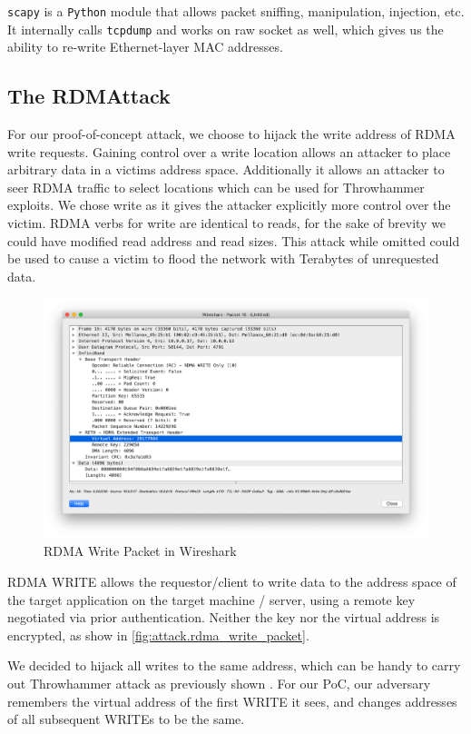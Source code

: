 \texttt{scapy} is a \texttt{Python} module that allows packet sniffing,
manipulation, injection, etc.  It internally calls \texttt{tcpdump} and works on
raw socket as well, which gives us the ability to re-write Ethernet-layer MAC
addresses.

\subsection{The RDMAttack }
\label{sec:attack.model}

For our proof-of-concept attack, we choose to hijack the write address of RDMA
write requests. Gaining control over a write location allows an attacker to
place arbitrary data in a victims address space. Additionally it allows an
attacker to seer RDMA traffic to select locations which can be used for
Throwhammer exploits. We chose write as it gives the attacker explicitly more
control over the victim. RDMA verbs for write are identical to reads, for the
sake of brevity we could have modified read address and read sizes. This attack
while omitted could be used to cause a victim to flood the network with
Terabytes of unrequested data.

\begin{figure}[h]
    \centering
    \includegraphics[width=0.5\textwidth - 5pt]{fig/rdma_write_packet_wireshark}
    \caption{RDMA Write Packet in Wireshark}
    \label{fig:attack.rdma_write_packet}
\end{figure}

RDMA WRITE allows the requestor/client to write data to the address space of the
target application on the target machine / server, using a remote key negotiated
via prior authentication. Neither the key nor the virtual address is encrypted,
as show in \autoref{fig:attack.rdma_write_packet}.

We decided to hijack all writes to the same address, which can be handy to carry out Throwhammer attack
as previously shown \cite{216055}.
For our PoC, our adversary remembers the virtual address of the first WRITE it sees,
and changes addresses of all subsequent WRITEs to be the same.

